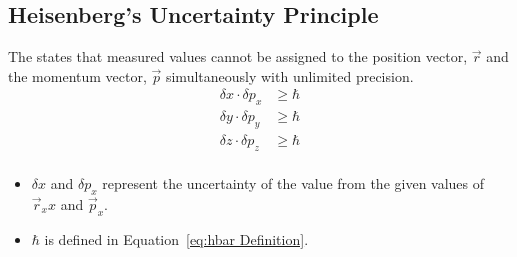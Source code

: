 \subsection{Heisenberg's Uncertainty Principle}\label{subsec:Heisenberg's Uncertainty Principle}
\begin{definition}\label{def:Heisenberg's Uncertainty Principle}
  The  states that measured values cannot be assigned to the position vector, $\vec{r}$ and the momentum vector, $\vec{p}$ simultaneously with unlimited precision.
  \begin{equation}\label{eq:Heisenberg's Uncertainty Principle}
    \begin{aligned}
      \delta x \cdot \delta p_{x} &\geq \hbar \\
      \delta y \cdot \delta p_{y} &\geq \hbar \\
      \delta z \cdot \delta p_{z} &\geq \hbar \\
    \end{aligned}
  \end{equation}
  \begin{itemize}[noitemsep, nolistsep]
  \item $\delta x$ and $\delta p_{x}$ represent the uncertainty of the value from the given values of $\vec{r}_{x}x$ and $\vec{p}_{x}$.
  \item $\hbar$ is defined in Equation~\eqref{eq:hbar Definition}.
  \end{itemize}
\end{definition}
